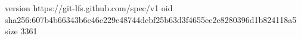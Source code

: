 version https://git-lfs.github.com/spec/v1
oid sha256:607b4b66343b6c46c229e48744dcbf25b63d3f4655ee2e8280396d1b824118a5
size 3361
